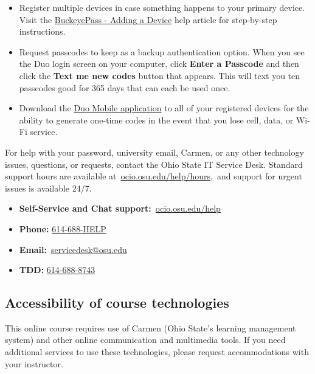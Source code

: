 \begin{itemize}
      \item
            Register multiple devices in case something happens to your primary device. Visit the \href{https://osuitsm.service-now.com/selfservice/kb_view.do?sysparm_article=kb05025}{BuckeyePass - Adding a Device} help article for step-by-step instructions.
      \item
            Request passcodes to keep as a backup authentication option. When you see the Duo login screen on your computer, click \textbf{Enter a Passcode} and then click the \textbf{Text me new codes} button that appears. This will text you ten passcodes good for 365 days that can each be used once.
      \item
            Download the \href{https://osuitsm.service-now.com/selfservice/kb_view.do?sysparm_article=kb05026}{Duo Mobile application} to all of your registered devices for the ability to generate one-time codes in the event that you lose cell, data, or Wi-Fi service.
\end{itemize}

For help with your password, university email, Carmen, or any other technology issues, questions, or requests, contact the Ohio State IT Service Desk. Standard support hours are available at~\href{https://ocio.osu.edu/help/hours}{ocio.osu.edu/help/hours},~and support for urgent issues is available 24/7.

\begin{itemize}
      \tightlist
      \item
            \textbf{Self-Service and Chat support:}~\href{http://ocio.osu.edu/help}{ocio.osu.edu/help}
      \item
            \textbf{Phone:} \href{tel:6146884357}{614-688-HELP}
      \item
            \textbf{Email:}~\href{mailto:8help@osu.edu}{servicedesk@osu.edu}
      \item
            \textbf{TDD:} \href{tel:6146888743}{614-688-8743}
\end{itemize}

\subsection{Accessibility of course technologies}

This online course requires use of Carmen (Ohio State's learning management system) and other online communication and multimedia tools. If you need additional services to use these technologies, please request accommodations with your instructor.~

